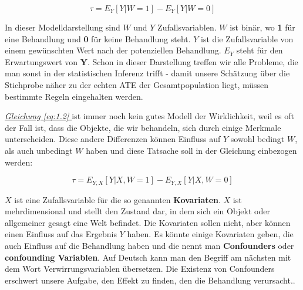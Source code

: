 \documentclass[12pt,a4paper,twoside]{scrartcl}
\numberwithin{equation}{section}
\renewcommand*{\refeq}[1]{\emph{\hyperref[#1]{Gleichung \ref*{#1} }}}
\begin{document}
\begin{equation}\label{eq:1.2}
  \tau = E_Y[Y|W = 1] - E_Y[Y|W = 0]
\end{equation}

\noindent
In dieser Modelldarstellung sind $W$ und $Y$ Zufallsvariablen. $W$ ist binär, wo \textbf{1} für eine Behandlung und \textbf{0} für keine Behandlung steht. $Y$ ist die Zufallsvariable von einem gewünschten Wert nach der potenziellen Behandlung. $E_Y$ steht für den Erwartungswert von \textbf{Y}. Schon in dieser Darstellung treffen wir alle Probleme, die man sonst in der statistischen Inferenz trifft - damit unsere Schätzung über die Stichprobe näher zu der echten ATE der Gesamtpopulation liegt, müssen bestimmte Regeln eingehalten werden.\par

\noindent
\refeq{eq:1.2} ist immer noch kein gutes Modell der Wirklichkeit, weil es oft der Fall ist, dass die Objekte, die wir behandeln, sich durch einige Merkmale unterscheiden. Diese andere Differenzen können Einfluss auf $Y$ sowohl bedingt $W$, als auch unbedingt $W$ haben und diese Tatsache soll in der Gleichung einbezogen werden:\par

\begin{equation}\label{eq:1.3}
  \tau = E_{Y,X}[Y|X,W = 1] - E_{Y,X}[Y|X,W = 0]
\end{equation}       	

\noindent 
$X$ ist eine Zufallsvariable für die so genannten \textbf{Kovariaten}. $X$ ist mehrdimensional und stellt den Zustand dar, in dem sich ein Objekt oder allgemeiner gesagt eine Welt befindet. Die Kovariaten sollen nicht, aber können einen Einfluss auf das Ergebnis $Y$ haben. Es könnte  einige Kovariaten geben, die auch Einfluss auf die Behandlung haben und die nennt man \textbf{Confounders} oder \textbf{confounding Variablen}. Auf Deutsch kann man den Begriff am nächsten mit dem Wort Verwirrungsvariablen übersetzen. Die Existenz von Confounders erschwert unsere Aufgabe, den Effekt zu finden, den die Behandlung verursacht.\cite{vanderweele2013definition}. \par
\end{document}
